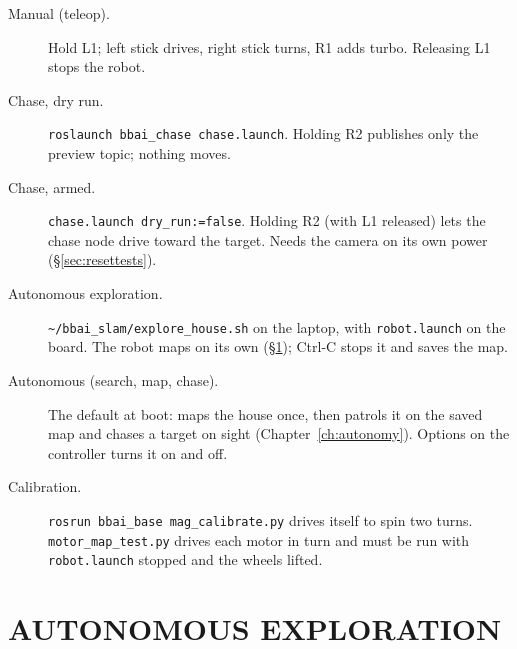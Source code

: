 \begin{description}
\item[Manual (teleop).] Hold L1; left stick drives, right stick turns, R1
  adds turbo. Releasing L1 stops the robot.
\item[Chase, dry run.] \texttt{roslaunch bbai\_chase chase.launch}. Holding R2
  publishes only the preview topic; nothing moves.
\item[Chase, armed.] \texttt{chase.launch dry\_run:=false}. Holding R2 (with
  L1 released) lets the chase node drive toward the target. Needs the
  camera on its own power (\S\ref{sec:resettests}).
\item[Autonomous exploration.] \texttt{\textasciitilde/bbai\_slam/explore\_house.sh}
  on the laptop, with \texttt{robot.launch} on the board. The robot maps on
  its own (\S\ref{sec:explore}); Ctrl-C stops it and saves the map.
\item[Autonomous (search, map, chase).] The default at boot: maps the house
  once, then patrols it on the saved map and chases a target on sight
  (Chapter~\ref{ch:autonomy}). Options on the controller turns it on and off.
\item[Calibration.] \texttt{rosrun bbai\_base mag\_calibrate.py} drives
   itself to spin two turns. \texttt{motor\_map\_test.py}
  drives each motor in turn and must be run with \texttt{robot.launch}
  stopped and the wheels lifted.
\end{description}

\section{AUTONOMOUS EXPLORATION}
\label{sec:explore}

